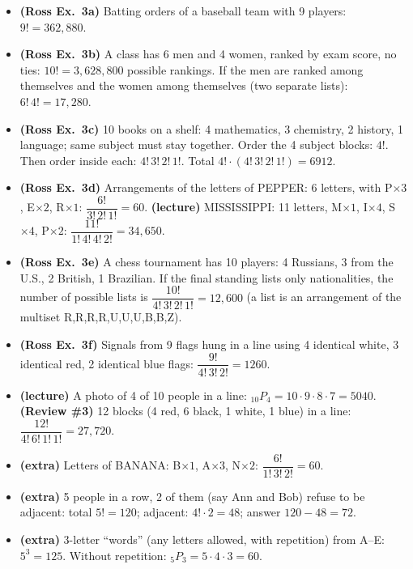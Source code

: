 \documentclass[11pt]{article}
\begin{document}
\begin{exbox}[Examples]
\begin{itemize}
\item \textbf{(Ross Ex.\ 3a)} Batting orders of a baseball team with 9 players: $9!=362{,}880$.
\item \textbf{(Ross Ex.\ 3b)} A class has 6 men and 4 women, ranked by exam score, no ties: $10!=3{,}628{,}800$ possible rankings. If the men are ranked among themselves and the women among themselves (two separate lists): $6!\,4!=17{,}280$.
\item \textbf{(Ross Ex.\ 3c)} 10 books on a shelf: 4 mathematics, 3 chemistry, 2 history, 1 language; same subject must stay together. Order the 4 subject blocks: $4!$. Then order inside each: $4!\,3!\,2!\,1!$. Total $4!\cdot(4!\,3!\,2!\,1!)=6912$.
\item \textbf{(Ross Ex.\ 3d)} Arrangements of the letters of PEPPER: 6 letters, with P$\times3$, E$\times2$, R$\times1$: $\dfrac{6!}{3!\,2!\,1!}=60$. \textbf{(lecture)} MISSISSIPPI: 11 letters, M$\times1$, I$\times4$, S$\times4$, P$\times2$: $\dfrac{11!}{1!\,4!\,4!\,2!}=34{,}650$.
\item \textbf{(Ross Ex.\ 3e)} A chess tournament has 10 players: 4 Russians, 3 from the U.S., 2 British, 1 Brazilian. If the final standing lists only nationalities, the number of possible lists is $\dfrac{10!}{4!\,3!\,2!\,1!}=12{,}600$ (a list is an arrangement of the multiset R,R,R,R,U,U,U,B,B,Z).
\item \textbf{(Ross Ex.\ 3f)} Signals from 9 flags hung in a line using 4 identical white, 3 identical red, 2 identical blue flags: $\dfrac{9!}{4!\,3!\,2!}=1260$.
\item \textbf{(lecture)} A photo of 4 of 10 people in a line: ${}_{10}P_4=10\cdot9\cdot8\cdot7=5040$. \textbf{(Review \#3)} 12 blocks (4 red, 6 black, 1 white, 1 blue) in a line: $\dfrac{12!}{4!\,6!\,1!\,1!}=27{,}720$.
\item \textbf{(extra)} Letters of BANANA: B$\times1$, A$\times3$, N$\times2$: $\dfrac{6!}{1!\,3!\,2!}=60$.
\item \textbf{(extra)} 5 people in a row, 2 of them (say Ann and Bob) refuse to be adjacent: total $5!=120$; adjacent: $4!\cdot2=48$; answer $120-48=72$.
\item \textbf{(extra)} 3-letter ``words'' (any letters allowed, with repetition) from A--E: $5^3=125$. Without repetition: ${}_5P_3=5\cdot4\cdot3=60$.
\end{itemize}
\end{exbox}
\end{document}
